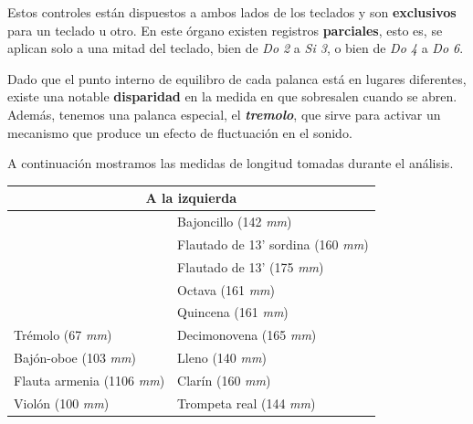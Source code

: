 \smallskip

Estos controles están dispuestos a ambos lados de los teclados y son \textbf{exclusivos} para un teclado u otro. En este órgano existen registros \textbf{parciales}, esto es, se aplican solo a una mitad del teclado, bien de \textit{Do 2} a \textit{Si 3}, o bien de \textit{Do 4} a \textit{Do 6}.

Dado que el punto interno de equilibro de cada palanca está en lugares diferentes, existe una notable \textbf{disparidad} en la medida en que sobresalen cuando se abren. Además, tenemos una palanca especial, el \textbf{\textit{tremolo}}, que sirve para activar un mecanismo que produce un efecto de fluctuación en el sonido.

A continuación mostramos las medidas de longitud tomadas durante el análisis.

\smallskip

\begin{center}
	\begin{tabular}{|l|l|}
		\hline \multicolumn{2}{|c|}{\textbf{A la izquierda}} \\	
		\hline & Bajoncillo (142 \textit{mm}) \\ 
		\hline & Flautado de 13' sordina (160 \textit{mm}) \\ 
		\hline & Flautado de 13' (175 \textit{mm})\\ 
		\hline & Octava (161 \textit{mm}) \\ 
		\hline & Quincena (161 \textit{mm}) \\ 
		\hline Trémolo (67 \textit{mm}) & Decimonovena (165 \textit{mm}) \\ 
		\hline Bajón-oboe (103 \textit{mm}) & Lleno (140 \textit{mm})  \\ 
		\hline Flauta armenia (1106 \textit{mm}) & Clarín (160 \textit{mm}) \\ 
		\hline  Violón (100 \textit{mm}) & Trompeta real (144 \textit{mm})  \\ 
		\hline
	\end{tabular}
	\smallskip
\end{center}

\smallskip
	

